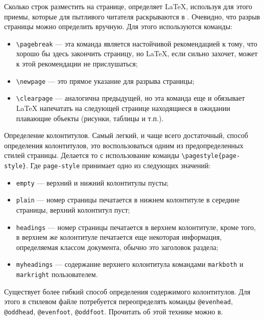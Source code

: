 Сколько строк разместить на странице, определяет \LaTeX, используя для этого приемы, 
которые для пытливого читателя раскрываются в . Очевидно, что разрыв страницы можно 
определить вручную. Для этого используются команды:
\begin{itemize}
\item \verb|\pagebreak| --- эта команда является настойчивой рекомендацией к тому, что
хорошо бы здесь закончить страницу, но \LaTeX, если сильно захочет, может к этой 
рекомендации не прислушаться;
\item \verb|\newpage| --- это прямое указание для разрыва страницы;
\item \verb|\clearpage| --- аналогична предыдущей, но эта команда еще и обязывает \LaTeX{}
напечатать на следующей странице находящиеся в ожидании плавающие объекты (рисунки, 
таблицы и т.п.).
\end{itemize}

Определение колонтитулов. Самый легкий, и чаще всего достаточный, способ определения 
колонтитулов, это воспользоваться одним из предопределенных стилей страницы. Делается 
то с использование команды \verb|\pagestyle{page-style}|. Где \verb|page-style| 
принимает одно из следующих значений:
\begin{itemize}
\item \verb|empty| --- верхний и нижний колонтитулы пусты;
\item \verb|plain| --- номер страницы печатается в нижнем колонтитуле в середине 
страницы, верхний колонтитул пуст;
\item \verb|headings| --- номер страницы печатается в верхнем колонтитуле, кроме того, 
в верхнем же колонтитуле печатается еще некоторая информация, определяемая классом
документа, обычно это заголовок раздела;
\item \sloppy\verb|myheadings| --- содержание верхнего колонтитула командами \verb|markboth| 
и \verb|markright| пользователем.
\end{itemize}
Существует более гибкий способ определения содержимого колонтитулов. Для этого в стилевом
файле потребуется переопределять команды \verb|@evenhead|, \verb|@oddhead|, 
\verb|@evenfoot|, \verb|@oddfoot|. Прочитать об этой технике можно в.
